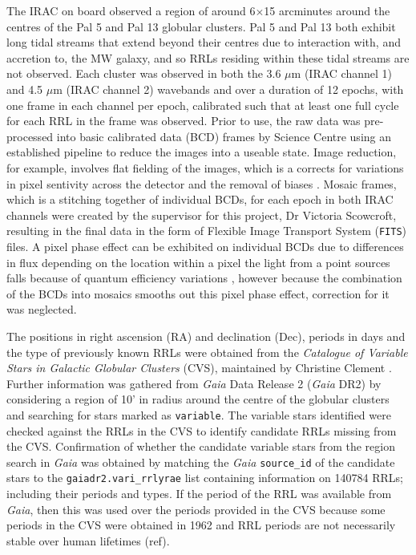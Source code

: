 \documentclass[11pt]{iopart}
\begin{document}
The IRAC on board  observed a region of around 6$\times$15 arcminutes around the centres of the Pal 5 and Pal 13 globular clusters. Pal 5 \cite{erkal2017} and Pal 13 \cite{bradford2011} both exhibit long tidal streams that extend beyond their centres due to interaction with, and accretion to, the MW galaxy, and so RRLs residing within these tidal streams are not observed. Each cluster was observed in both the 3.6 $\mu$m (IRAC channel 1) and 4.5 $\mu$m (IRAC channel 2) wavebands and over a duration of 12 epochs, with one frame in each channel per epoch, calibrated such that at least one full cycle for each RRL in the frame was observed. Prior to use, the raw data was pre-processed into basic calibrated data (BCD) frames by  Science Centre using an established pipeline to reduce the images into a useable state. Image reduction, for example, involves flat fielding of the images, which is a corrects for variations in pixel sentivity across the detector and the removal of biases \cite{reach2005absolute}. Mosaic frames, which is a stitching together of individual BCDs, for each epoch in both IRAC channels were created by the supervisor for this project, Dr Victoria Scowcroft, resulting in the final data in the form of Flexible Image Transport System (\verb"FITS") files. A pixel phase effect can be exhibited on individual BCDs due to differences in flux depending on the location within a pixel the light from a point sources falls because of quantum efficiency variations \cite{irachandbook}, however because the combination of the BCDs into mosaics smooths out this pixel phase effect, correction for it was neglected.

The positions in right ascension (RA) and declination (Dec), periods in days and the type of previously known RRLs were obtained from the \textit{Catalogue of Variable Stars in Galactic Globular Clusters} (CVS), maintained by Christine Clement \cite{clement}. Further information was gathered from \textit{Gaia} Data Release 2 (\textit{Gaia} DR2) \cite{gaia} by considering a region of 10' in radius around the centre of the globular clusters and searching for stars marked as \verb"variable". The variable stars identified were checked against the RRLs in the CVS to identify candidate RRLs missing from the CVS. Confirmation of whether the candidate variable stars from the region search in \textit{Gaia} was obtained by matching the \textit{Gaia} \verb"source_id" of the candidate stars to the \verb"gaiadr2.vari_rrlyrae" list containing information on 140784 RRLs; including their periods and types. If the period of the RRL was available from \textit{Gaia}, then this was used over the periods provided in the CVS because some periods in the CVS were obtained in 1962 \cite{kinman1962notes} and RRL periods are not necessarily stable over human lifetimes (ref).
\end{document}
